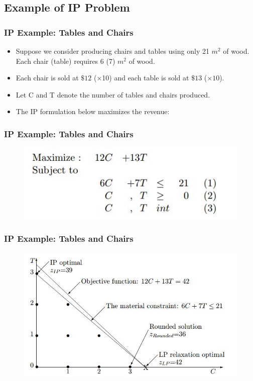 \documentclass{beamer}
\begin{document}
\subsection{Example of IP Problem}
\begin{frame}
\frametitle{IP Example:  Tables and Chairs}
\begin{itemize}
	\item Suppose we consider producing chairs and tables using only 21 $m^2$ of
	wood. Each chair (table) requires 6 (7) $m^2$ of wood. 
	\item Each chair is sold at $\$12$ (×10) and each table is sold
	at $\$13$ ($\times 10$). 
	\item Let C and T denote the number of tables and chairs produced. 
	\item The IP formulation below
	maximizes the revenue:
\end{itemize}
\end{frame}
\begin{frame}
\frametitle{IP Example:  Tables and Chairs}
\begin{figure}
\centering
\includegraphics[width=0.7\linewidth]{IPintro1}
\end{figure}

\end{frame}
\begin{frame}
\frametitle{IP Example:  Tables and Chairs}
\begin{figure}
\centering
\includegraphics[width=0.7\linewidth]{IPintro2}
\caption{}
\label{fig:IPintro2}
\end{figure}
\end{frame}
\end{document}
